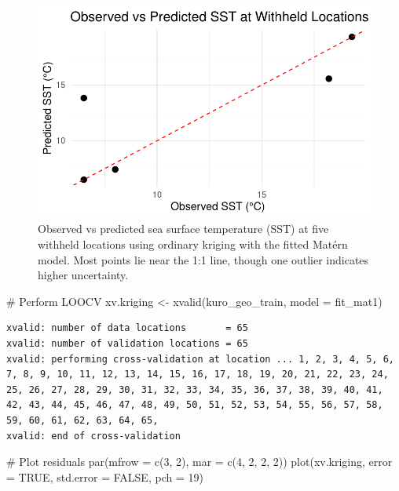 \documentclass[
  11pt,
]{article}
\newenvironment{Shaded}{\begin{snugshade}}{\end{snugshade}}
\newcommand{\AttributeTok}[1]{\textcolor[rgb]{0.40,0.45,0.13}{#1}}
\newcommand{\CommentTok}[1]{\textcolor[rgb]{0.37,0.37,0.37}{#1}}
\newcommand{\ConstantTok}[1]{\textcolor[rgb]{0.56,0.35,0.01}{#1}}
\newcommand{\DecValTok}[1]{\textcolor[rgb]{0.68,0.00,0.00}{#1}}
\newcommand{\FunctionTok}[1]{\textcolor[rgb]{0.28,0.35,0.67}{#1}}
\newcommand{\NormalTok}[1]{\textcolor[rgb]{0.00,0.23,0.31}{#1}}
\newcommand{\OtherTok}[1]{\textcolor[rgb]{0.00,0.23,0.31}{#1}}
\begin{document}
\begin{figure}[H]

{\centering \includegraphics{project_files/figure-pdf/fig-krigscatter-1.pdf}

}

\caption{Observed vs predicted sea surface temperature (SST) at five
withheld locations using ordinary kriging with the fitted Matérn model.
Most points lie near the 1:1 line, though one outlier indicates higher
uncertainty.}

\end{figure}%

\begin{Shaded}
\begin{Highlighting}[]
\CommentTok{\# Perform LOOCV}
\NormalTok{xv.kriging }\OtherTok{\textless{}{-}} \FunctionTok{xvalid}\NormalTok{(kuro\_geo\_train, }\AttributeTok{model =}\NormalTok{ fit\_mat1)}
\end{Highlighting}
\end{Shaded}

\begin{verbatim}
xvalid: number of data locations       = 65
xvalid: number of validation locations = 65
xvalid: performing cross-validation at location ... 1, 2, 3, 4, 5, 6, 7, 8, 9, 10, 11, 12, 13, 14, 15, 16, 17, 18, 19, 20, 21, 22, 23, 24, 25, 26, 27, 28, 29, 30, 31, 32, 33, 34, 35, 36, 37, 38, 39, 40, 41, 42, 43, 44, 45, 46, 47, 48, 49, 50, 51, 52, 53, 54, 55, 56, 57, 58, 59, 60, 61, 62, 63, 64, 65, 
xvalid: end of cross-validation
\end{verbatim}

\begin{Shaded}
\begin{Highlighting}[]
\CommentTok{\# Plot residuals}
\FunctionTok{par}\NormalTok{(}\AttributeTok{mfrow =} \FunctionTok{c}\NormalTok{(}\DecValTok{3}\NormalTok{, }\DecValTok{2}\NormalTok{), }\AttributeTok{mar =} \FunctionTok{c}\NormalTok{(}\DecValTok{4}\NormalTok{, }\DecValTok{2}\NormalTok{, }\DecValTok{2}\NormalTok{, }\DecValTok{2}\NormalTok{))}
\FunctionTok{plot}\NormalTok{(xv.kriging, }\AttributeTok{error =} \ConstantTok{TRUE}\NormalTok{, }\AttributeTok{std.error =} \ConstantTok{FALSE}\NormalTok{, }\AttributeTok{pch =} \DecValTok{19}\NormalTok{)}
\end{Highlighting}
\end{Shaded}
\end{document}
